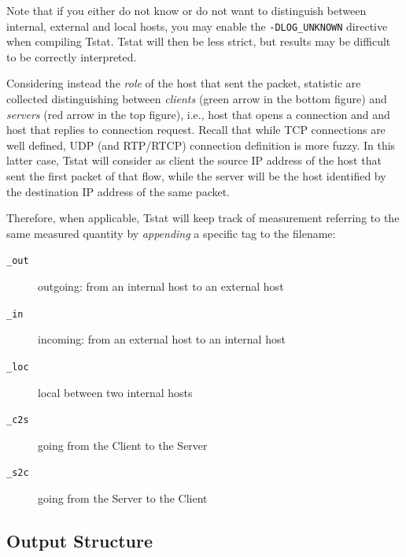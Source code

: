\documentclass[11pt]{article}
\begin{document}
Note that if you either do not know or do not want to distinguish between
internal, external and local hosts, you may enable the \texttt{-DLOG\_UNKNOWN}
directive when compiling Tstat. Tstat will then be less strict, but results may
be difficult to be correctly interpreted.



Considering instead the \textit{role} of the host that sent the packet,  statistic are
collected distinguishing between \textit{clients} (green arrow in the bottom figure)
and \textit{servers} (red arrow in the top figure), i.e., host
that opens a connection and and host that replies to connection request. Recall
that while TCP connections are well defined, UDP (and RTP/RTCP) connection
definition is more fuzzy. In this latter case, Tstat will consider as client the
source IP address of the host that sent the first packet of that flow, while the
server will be the host identified by the destination IP address of the same
packet.



Therefore, when applicable, Tstat will keep track of measurement referring to
the same measured quantity by \textit{appending} a specific tag  to the filename:

\begin{description}

\item[\texttt{\_out}] \mbox{}

outgoing: from an internal host to an external host


\item[\texttt{\_in}] \mbox{}

incoming: from an external host to an internal host


\item[\texttt{\_loc}] \mbox{}

local between two internal hosts


\item[\texttt{\_c2s}] \mbox{}

going from the Client to the Server


\item[\texttt{\_s2c}] \mbox{}

going from the Server to the Client

\end{description}
\subsection{Output Structure\label{Output_Structure}}
\end{document}
